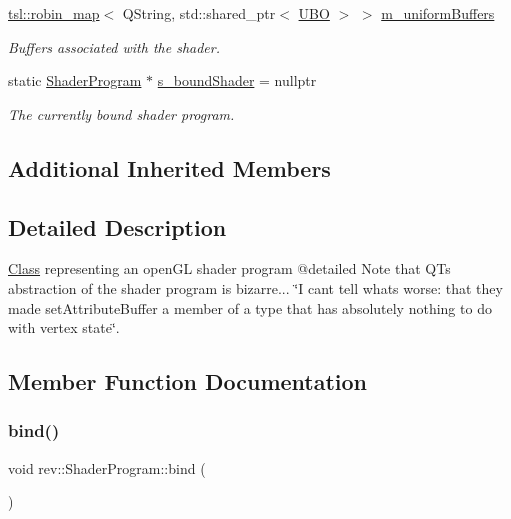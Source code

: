 \begin{DoxyCompactItemize}
\mbox{\hyperlink{classtsl_1_1robin__map}{tsl\+::robin\+\_\+map}}$<$ Q\+String, std\+::shared\+\_\+ptr$<$ \mbox{\hyperlink{classrev_1_1_u_b_o}{U\+BO}} $>$ $>$ \mbox{\hyperlink{classrev_1_1_shader_program_aa642643963ce7fd924d9bceb2a8991c7}{m\+\_\+uniform\+Buffers}}
\begin{DoxyCompactList}\small\item\em Buffers associated with the shader. \end{DoxyCompactList}\item 
\mbox{\label{classrev_1_1_shader_program_aa5b39ed5e011f555f4a9d73bcd5f3ad9}} 
static \mbox{\hyperlink{classrev_1_1_shader_program}{Shader\+Program}} $\ast$ \mbox{\hyperlink{classrev_1_1_shader_program_aa5b39ed5e011f555f4a9d73bcd5f3ad9}{s\+\_\+bound\+Shader}} = nullptr
\begin{DoxyCompactList}\small\item\em The currently bound shader program. \end{DoxyCompactList}\end{DoxyCompactItemize}
\subsection*{Additional Inherited Members}


\subsection{Detailed Description}
\mbox{\hyperlink{struct_class}{Class}} representing an open\+GL shader program @detailed Note that QT\textquotesingle{}s abstraction of the shader program is bizarre... \char`\"{}\+I can\textquotesingle{}t tell what\textquotesingle{}s worse\+: 
that they made set\+Attribute\+Buffer a member of a type that has absolutely nothing to do with vertex state\char`\"{}. 

\subsection{Member Function Documentation}
\mbox{\label{classrev_1_1_shader_program_adbb68e6df7d72ffd81faac60f8f4ff05}} 
\subsubsection{\texorpdfstring{bind()}{bind()}}
{\footnotesize\ttfamily void rev\+::\+Shader\+Program\+::bind (\begin{DoxyParamCaption}{ }\end{DoxyParamCaption})}



